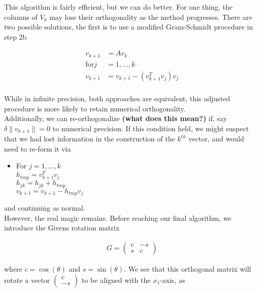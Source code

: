 \documentclass[11pt]{article}
\begin{document}
This algorithm is fairly efficient, but we can do better. For one thing, the columns of $V_k$ may lose their orthogonality as the method progresses. There are two possible solutions, the first is to use a modified Gram-Schmidt procedure in step 2b

\begin{align*}
  v_{k+1} &= A v_k \\
  \textrm{for} j &= 1, \dots, k \\
  v_{k+1} &= v_{k+1} - (v_{k+1}^Tv_j)v_j \\
\end{align*}

While in infinite precision, both approaches are equivalent, this adjusted procedure is more likely to retain numerical orthogonality. \\

Additionally, we can re-orthogonalize \textbf{(what does this mean?)} if, say $\delta \| v_{k+1} \| = 0$ to numerical precision. If this condition held, we might suspect that we had lost information in the construction of the $k^{th}$ vector, and would need to re-form it via

\begin{itemize}
\renewcommand{\labelitemi}{$\circ$}
\item For $j = 1, \dots, k$ \\
  $h_{tmp} = v_{k+1}^T v_j$ \\
  $h_{jk} = h_{jk} + h_{tmp}$ \\
  $v_{k+1} = v_{k+1} - h_{tmp}v_j$ \\
\end{itemize}

and continuing as normal. \\

However, the real magic remains. Before reaching our final algorithm, we introduce the Givens rotation matrix

\begin{align*}
  G = \begin{pmatrix} c & -s \\ s & c \end{pmatrix}
\end{align*}

where $c = \cos(\theta)$ and $s = \sin(\theta)$. We see that this orthogonal matrix will rotate a vector $\begin{pmatrix} c \\ -s \end{pmatrix}$ to be aligned with the $x_1$-axis, as
\end{document}
